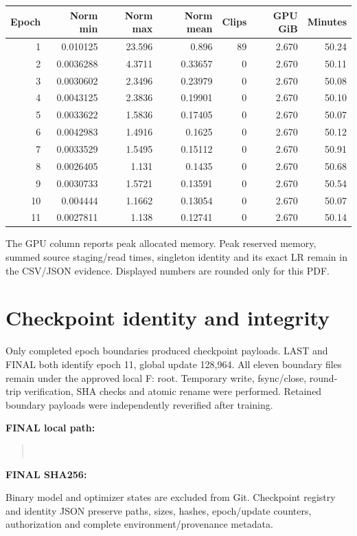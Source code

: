 \documentclass[10pt,a4paper]{article}
\begin{document}
{\small\setlength{\tabcolsep}{5pt}
\begin{longtable}{rrrrrrr}
Epoch & Norm min & Norm max & Norm mean & Clips & GPU GiB & Minutes\\\hline
1 & 0.010125 & 23.596 & 0.896 & 89 & 2.670 & 50.24 \\
2 & 0.0036288 & 4.3711 & 0.33657 & 0 & 2.670 & 50.11 \\
3 & 0.0030602 & 2.3496 & 0.23979 & 0 & 2.670 & 50.08 \\
4 & 0.0043125 & 2.3836 & 0.19901 & 0 & 2.670 & 50.10 \\
5 & 0.0033622 & 1.5836 & 0.17405 & 0 & 2.670 & 50.07 \\
6 & 0.0042983 & 1.4916 & 0.1625 & 0 & 2.670 & 50.12 \\
7 & 0.0033529 & 1.5495 & 0.15112 & 0 & 2.670 & 50.91 \\
8 & 0.0026405 & 1.131 & 0.1435 & 0 & 2.670 & 50.68 \\
9 & 0.0030733 & 1.5721 & 0.13591 & 0 & 2.670 & 50.54 \\
10 & 0.004444 & 1.1662 & 0.13054 & 0 & 2.670 & 50.07 \\
11 & 0.0027811 & 1.138 & 0.12741 & 0 & 2.670 & 50.14 \\
\end{longtable}}
The GPU column reports peak allocated memory. Peak reserved memory, summed
source staging/read times, singleton identity and its exact LR remain in the
CSV/JSON evidence. Displayed numbers are rounded only for this PDF.

\section*{Checkpoint identity and integrity}
Only completed epoch boundaries produced checkpoint payloads. LAST and FINAL
both identify epoch 11, global update 128,964. All eleven boundary files remain
under the approved local F: root. Temporary write, fsync/close, round-trip
verification, SHA checks and atomic rename were performed. Retained boundary
payloads were independently reverified after training.

\textbf{FINAL local path:}
\begin{quote}\small{}\\
\end{quote}
\textbf{FINAL SHA256:}
\begin{quote}\small{}\end{quote}
Binary model and optimizer states are excluded from Git. Checkpoint registry
and identity JSON preserve paths, sizes, hashes, epoch/update counters,
authorization and complete environment/provenance metadata.
\end{document}
